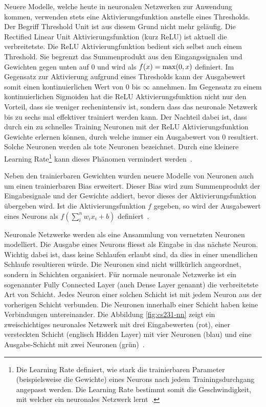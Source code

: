 Neuere Modelle, welche heute in neuronalen Netzwerken zur Anwendung kommen, verwenden stets eine Aktivierungsfunktion anstelle eines Thresholds. Der Begriff Threshold Unit ist aus diesem Grund nicht mehr geläufig. Die Rectified Linear Unit Aktivierungsfunktion (kurz ReLU) ist aktuell die verbreitetste. Die ReLU Aktivierungfunktion bedient sich selbst auch einem Threshold. Sie begrenzt das Summenprodukt aus den Eingangssignalen und Gewichten gegen unten auf 0 und wird als $f(x) = \textnormal{max}(0, x)$ definiert. Im Gegensatz zur Aktivierung aufgrund eines Thresholds kann der Ausgabewert somit einen kontinuierlichen Wert von 0 bis $\infty$ annehmen. Im Gegensatz zu einem kontinuierlichen Sigmoiden hat die ReLU Aktivierungsfunktion nicht nur den Vorteil, dass sie weniger rechenintensiv ist, sondern dass das neuronale Netzwerk bis zu sechs mal effektiver trainiert werden kann. Der Nachteil dabei ist, dass durch ein zu schnelles Training Neuronen mit der ReLU Aktivierungsfunktion Gewichte erlernen können, durch welche immer ein Ausgabewert von 0 resultiert. Solche Neuronen werden als tote Neuronen bezeichnet. Durch eine kleinere Learning Rate\footnote{Die Learning Rate definiert, wie stark die trainierbaren Parameter (beispielsweise die Gewichte) eines Neurons nach jedem Trainingsdurchgang angepasst werden. Die Learning Rate bestimmt somit die Geschwindigkeit, mit welcher ein neuronales Netzwerk lernt~\autocite{Goodfellow2016}.} kann dieses Phänomen vermindert werden~\autocite{cs231NN}.

Neben den trainierbaren Gewichten wurden neuere Modelle von Neuronen auch um einen trainierbaren Bias erweitert. Dieser Bias wird zum Summenprodukt der Eingabesignale und der Gewichte addiert, bevor dieses der Aktivierungsfunktion übergeben wird. Ist die Aktivierungsfunktion $f$ gegeben, so wird der Ausgabewert eines Neurons als $f(\sum_{i}^{n}{w_{i}x_{i}}+b)$ definiert~\autocite{cs231NN}.

Neuronale Netzwerke werden als eine Ansammlung von vernetzten Neuronen modelliert. Die Ausgabe eines Neurons fliesst als Eingabe in das nächste Neuron. Wichtig dabei ist, dass keine Schlaufen erlaubt sind, da dies in einer unendlichen Schlaufe resultieren würde. Die Neuronen sind nicht willkürlich angeordnet, sondern in Schichten organisiert. Für normale neuronale Netzwerke ist ein sogenannter Fully Connected Layer (auch Dense Layer genannt) die verbreitetste Art von Schicht. Jedes Neuron einer solchen Schicht ist mit jedem Neuron aus der vorherigen Schicht verbunden. Die Neuronen innerhalb einer Schicht haben keine Verbindungen untereinander. Die Abbildung \ref{fig:cs231-nn} zeigt ein zweischichtiges neuronales Netzwerk mit drei Eingabewerten (rot), einer versteckten Schicht (englisch Hidden Layer) mit vier Neuronen (blau) und eine Ausgabe-Schicht mit zwei Neuronen (grün)~\autocite{cs231NN}.

